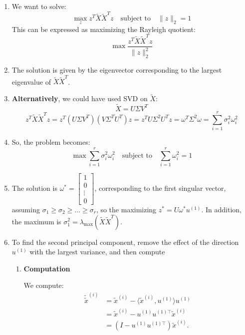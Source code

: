 \begin{example}
\begin{enumerate}
        \item We want to solve:
        \[
        \max_{z} z^T \tilde{X} \tilde{X}^T z \quad \text{subject to} \quad \|z\|_2 = 1
        \]
        This can be expressed as maximizing the Rayleigh quotient:
        \[
        \max \frac{z^T \tilde{X} \tilde{X}^T z}{\|z\|_2^2}
        \]
        
       \item The solution is given by the eigenvector corresponding to the largest eigenvalue of \( \tilde{X} \tilde{X}^T \).
        
        \item \textbf{Alternatively}, we could have used SVD on \( \tilde{X} \):
        \[
        \tilde{X} = U \Sigma V^T
        \]
        \[
        z^T \tilde{X} \tilde{X}^T z = z^T \left( U \Sigma V^T \right) \left( V \Sigma^T U^T \right) z = z^T U \Sigma^2 U^T z = \omega^T \Sigma^2 \omega = \sum_{i=1}^{r} \sigma_i^2 \omega_i^2
        \]
        
        \item So, the problem becomes:
        \[
        \max \sum_{i=1}^{r} \sigma_i^2 \omega_i^2 \quad \text{subject to} \quad \sum_{i=1}^{r} \omega_i^2 = 1
        \]
        
        \item The solution is \( \omega^* = \begin{bmatrix} 1 \\ 0 \\ \vdots \\ 0 \end{bmatrix} \), corresponding to the first singular vector, assuming $\sigma_1 \geq \sigma_2 \geq \ldots \geq \sigma_r$, so the maximizing $z^* = U \omega^* u^{(1)}$.
        In addition, the maximum is \( \sigma_1^2 = \lambda_{\max} (\tilde{X} \tilde{X}^T) \).
        
        \item To find the second principal component, remove the effect of the direction $u^{(1)}$ with the largest variance, and then compute

        \begin{enumerate}
            \item \textbf{Computation}

            We compute:
            \begin{align*}
            \tilde{\tilde{x}}^{(i)} &= \tilde{x}^{(i)} - \langle \tilde{x}^{(i)}, u^{(1)} \rangle u^{(1)} \\
            &= \tilde{x}^{(i)} - u^{(1)} u^{(1)\top} \tilde{x}^{(i)} \\
            &= \left(I - u^{(1)} u^{(1)\top} \right) \tilde{x}^{(i)}.
            \end{align*}
    

\end{enumerate}
\end{enumerate}
\end{example}
